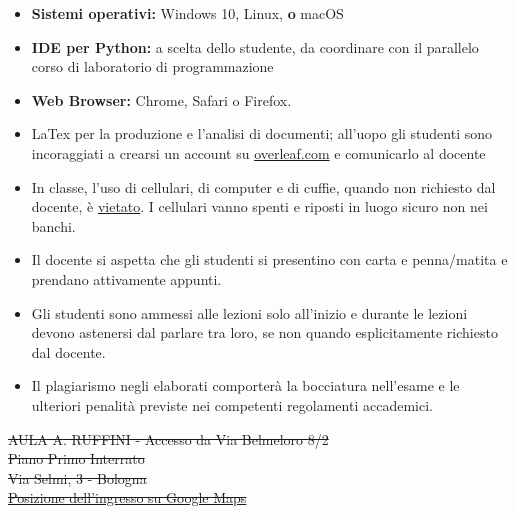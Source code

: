 \documentclass[11pt, a4paper]{article}
\begin{document}
\begin{itemize}[itemsep=2pt,parsep=0pt,topsep=2pt,partopsep=2pt]
	\item[\color{darkblue}\faLaptopCode] \textbf{Sistemi operativi:} \faWindows {} Windows  10,  \faLinux {} Linux, \textcolor{vanierred}{\textbf{o}} \faApple {} macOS 
	\item[\color{darkblue}\faCode] \textbf{IDE per Python:} \faUnity a scelta dello studente, da coordinare con il parallelo corso di laboratorio di programmazione
	\item [{\color{darkblue}\faChrome}] \textbf{Web Browser:} Chrome, Safari o Firefox.   
	\item[{\color{darkblue} \faWpforms}] LaTex per la produzione e l'analisi di documenti; all'uopo gli studenti sono incoraggiati a crearsi un account su \url{overleaf.com} e comunicarlo al docente
\end{itemize}   

\begin{itemize}[itemsep=2.5pt,parsep=0pt,topsep=8pt,partopsep=4pt]
	\item[{ \color{darkblue} \faLaptop \faMobile \faHeadphones}] In classe, l'uso di cellulari, di computer e di cuffie, quando non richiesto dal docente, \`{e}  \underline{vietato}. I cellulari vanno spenti e riposti in luogo sicuro non nei banchi.
	
	\item[{\color{darkblue} \faEdit}] Il docente si aspetta che gli studenti si presentino con carta e penna/matita e prendano attivamente appunti.
	\item[{\color{darkblue} \faWechat}] Gli studenti sono ammessi alle lezioni solo all'inizio e durante le lezioni devono astenersi dal parlare tra loro, se non quando esplicitamente richiesto dal docente.
	
	\item[{\color{darkred} \faThumbsDown}] Il plagiarismo negli elaborati comporter\`{a} la bocciatura nell'esame e le ulteriori penalit\`{a} previste nei competenti regolamenti accademici.
\end{itemize}


\noindent
\sout{AULA A. RUFFINI - Accesso da Via Belmeloro 8/2 \\
Piano Primo Interrato \\
Via Selmi, 3 - Bologna \\
\href{https://goo.gl/maps/iqA6NbC71YwRTXKj6}{Posizione dell'ingresso su Google Maps}\\}
\end{document}
